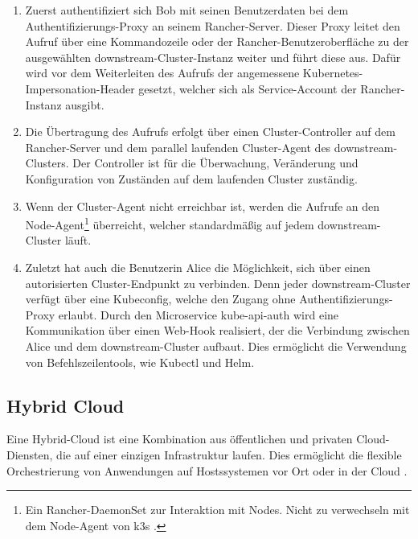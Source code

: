 \begin{enumerate}
\item Zuerst authentifiziert sich Bob mit seinen Benutzerdaten bei dem Authentifizie\-rungs-Proxy an seinem Rancher-Server.
Dieser Proxy leitet den Aufruf über eine Kommandozeile oder der Rancher-Benutzeroberfläche zu der ausgewählten downstream-Cluster-Instanz weiter und führt diese aus.
Dafür wird vor dem Weiterleiten des Aufrufs der angemessene Kubernetes-Impersonation-Header gesetzt, 
welcher sich als Service-Account der Rancher-Instanz ausgibt.   
\item Die Übertragung des Aufrufs erfolgt über einen Cluster-Controller auf dem Rancher-Server
und dem parallel laufenden Cluster-Agent des downstream-Clusters. Der Controller ist für die Überwachung, Veränderung
und Konfiguration von Zuständen auf dem laufenden Cluster zuständig. 
\item Wenn der Cluster-Agent nicht erreichbar ist,
werden die Aufrufe an den Node-Agent\footnote{Ein Rancher-DaemonSet zur Interaktion mit Nodes. 
Nicht zu verwechseln mit dem Node-Agent von k3s \cite{rancherAgents}. } überreicht, welcher standardmäßig auf jedem downstream-Cluster läuft.
\item Zuletzt hat auch die Benutzerin Alice die Möglichkeit, sich über einen autorisierten Cluster-Endpunkt zu verbinden.
Denn jeder downstream-Cluster verfügt über eine Kubeconfig, welche den Zugang ohne Authentifizierungs-Proxy erlaubt.
Durch den Microservice kube-api-auth wird eine Kommunikation über einen Web-Hook realisiert, der die Verbindung
zwischen Alice und dem downstream-Cluster aufbaut. 
Dies ermöglicht die Verwendung von Befehlszeilentools, wie Kubectl und Helm.
\end{enumerate}

\subsection{Hybrid Cloud}
Eine Hybrid-Cloud ist eine Kombination aus öffentlichen und privaten Cloud-Diensten, die auf einer einzigen Infrastruktur laufen.
Dies ermöglicht die flexible Orchestrierung von Anwendungen auf Hostssystemen vor Ort oder in der Cloud \cite{ibmHybrid}.

